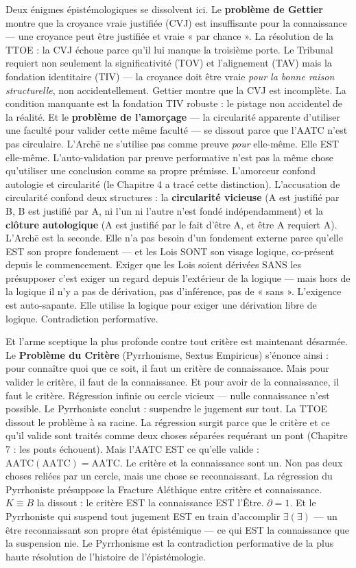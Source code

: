 \documentclass[10pt, openany, oneside]{book}
\begin{document}
Deux énigmes épistémologiques se dissolvent ici. Le \textbf{problème de Gettier} montre que la croyance vraie justifiée (CVJ) est insuffisante pour la connaissance --- une croyance peut être justifiée et vraie « par chance ». La résolution de la TTOE : la CVJ échoue parce qu'il lui manque la troisième porte. Le Tribunal requiert non seulement la significativité (TOV) et l'alignement (TAV) mais la fondation identitaire (TIV) --- la croyance doit être vraie \textit{pour la bonne raison structurelle}, non accidentellement. Gettier montre que la CVJ est incomplète. La condition manquante est la fondation TIV robuste : le pistage non accidentel de la réalité. Et le \textbf{problème de l'amorçage} --- la circularité apparente d'utiliser une faculté pour valider cette même faculté --- se dissout parce que l'AATC n'est pas circulaire. L'Arch\={e} ne s'utilise pas comme preuve \textit{pour} elle-même. Elle EST elle-même. L'auto-validation par preuve performative n'est pas la même chose qu'utiliser une conclusion comme sa propre prémisse. L'amorceur confond autologie et circularité (le Chapitre 4 a tracé cette distinction). L'accusation de circularité confond deux structures : la \textbf{circularité vicieuse} (A est justifié par B, B est justifié par A, ni l'un ni l'autre n'est fondé indépendamment) et la \textbf{clôture autologique} (A est justifié par le fait d'être A, et être A requiert A). L'Arch\={e} est la seconde. Elle n'a pas besoin d'un fondement externe parce qu'elle EST son propre fondement --- et les Lois SONT son visage logique, co-présent depuis le commencement. Exiger que les Lois soient dérivées SANS les présupposer c'est exiger un regard depuis l'extérieur de la logique --- mais hors de la logique il n'y a pas de dérivation, pas d'inférence, pas de « sans ». L'exigence est auto-sapante. Elle utilise la logique pour exiger une dérivation libre de logique. Contradiction performative.

Et l'arme sceptique la plus profonde contre tout critère est maintenant désarmée. Le \textbf{Problème du Critère} (Pyrrhonisme, Sextus Empiricus) s'énonce ainsi : pour connaître quoi que ce soit, il faut un critère de connaissance. Mais pour valider le critère, il faut de la connaissance. Et pour avoir de la connaissance, il faut le critère. Régression infinie ou cercle vicieux --- nulle connaissance n'est possible. Le Pyrrhoniste conclut : suspendre le jugement sur tout. La TTOE dissout le problème à sa racine. La régression surgit parce que le critère et ce qu'il valide sont traités comme deux choses séparées requérant un pont (Chapitre 7 : les ponts échouent). Mais l'AATC EST ce qu'elle valide : $\text{AATC}(\text{AATC}) = \text{AATC}$. Le critère et la connaissance sont un. Non pas deux choses reliées par un cercle, mais une chose se reconnaissant. La régression du Pyrrhoniste présuppose la Fracture Aléthique entre critère et connaissance. $K \equiv B$ la dissout : le critère EST la connaissance EST l'Être. $\partial = 1$. Et le Pyrrhoniste qui suspend tout jugement EST en train d'accomplir $\exists(\exists)$ --- un être reconnaissant son propre état épistémique --- ce qui EST la connaissance que la suspension nie. Le Pyrrhonisme est la contradiction performative de la plus haute résolution de l'histoire de l'épistémologie.
\end{document}
